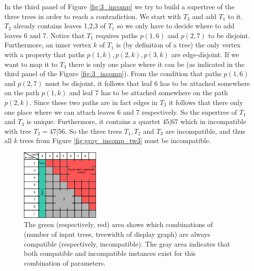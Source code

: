 In the third panel of Figure \ref{fig:3_incomp} we try to build a supertree of the three trees in order to reach a contradiction. We start with $T_3$ and add $T_1$ to it. $T_3$ already contains leaves 1,2,3 of $T_1$ so we only have to decide where to add leaves 6 and 7. Notice that $T_1$ requires paths $p(1,6)$ and $p(2,7)$ to be disjoint. Furthermore, an inner vertex $k$ of $T_1$ is (by definition of a tree) the only vertex with a property that paths $p(1,k), p(2,k), p(3,k)$ are edge-disjoint. If we want to map it to $T_3$ there is only one place where it can be (as indicated in the third panel of the Figure \ref{fig:3_incomp}). From the condition that paths $p(1,6)$ and $p(2,7)$ must be disjoint, it follows that leaf 6 has to be attached somewhere on the path $p(1,k)$ and leaf 7 has to be attached somewhere on the path $p(2,k)$. Since these two paths are in fact edges in $T_3$ it follows that there only one place where we can attach leaves 6 and 7 respectively. So the supertree of $T_1$ and $T_3$ is unique. Furthermore, it contains a quartet $45|67$ which in incompatible with tree $T_2=47|56$. So the three trees $T_1, T_2$ and $T_3$ are incompatible, and thus all $k$ trees from Figure \ref{fig:gray_incomp_tw3} must be incompatible.











\begin{figure}[h]
	\centering
		\includegraphics[width=0.35\textwidth]{../figs/ch5/table.pdf}
	\caption{The green (respectively, red) area shows which combinations of  (number of input trees, treewidth of display graph) are always compatible (respectively, incompatible). The gray area indicates that both compatible and incompatible instances exist for this combination of parameters.}
	\label{fig:table}
\end{figure}


